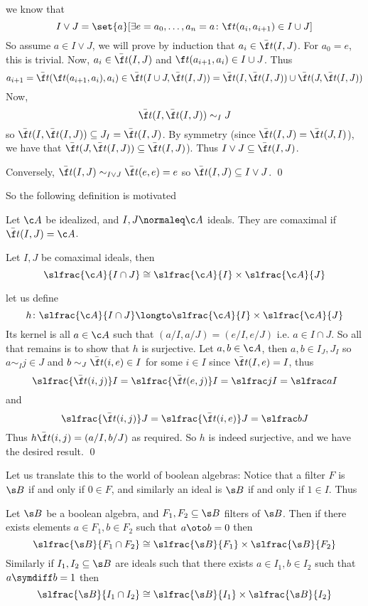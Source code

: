 \Proof we know that
$$ I\vee J = \set{a}[\exists e=a_0,\dots,a_n=a\colon\f t(a_i,a_{i+1})\in I\cup J] $$
So assume $a\in I\vee J$, we will prove by induction that $a_i\in\bar{\f t}(I,J)$.
For $a_0=e$, this is trivial.
Now, $a_i\in\bar{\f t}(I,J)$ and $\f t(a_{i+1},a_i)\in I\cup J$.
Thus
$$ a_{i+1} = \bar{\f t}(\f t(a_{i+1},a_i),a_i) \in \bar{\f t}(I\cup J,\bar{\f t}(I,J)) = \bar{\f t}(I,\bar{\f t}(I,J)) \cup \bar{\f t}(J,\bar{\f t}(I,J)) $$
Now,
$$ \bar{\f t}(I,\bar{\f t}(I,J)) \sim_I J $$
so $\bar{\f t}(I,\bar{\f t}(I,J))\subseteq J_I=\bar{\f t}(I,J)$.
By symmetry (since $\bar{\f t}(I,J)=\bar{\f t}(J,I)$), we have that $\bar{\f t}(J,\bar{\f t}(I,J))\subseteq\bar{\f t}(I,J)$).
Thus $I\vee J\subseteq\bar{\f t}(I,J)$.

Conversely, $\bar{\f t}(I,J)\sim_{I\vee J}\bar{\f t}(e,e)=e$ so $\bar{\f t}(I,J)\subseteq I\vee J$.
\qed

So the following definition is motivated

\bdefn

    Let $\c A$ be idealized, and $I,J\normaleq\c A$ ideals.
    They are {\emphcolor comaximal} if $\bar{\f t}(I,J)=\c A$.

\edefn

\bthrm[title=The Idealized Chinese Remainder Theorem]

    Let $I,J$ be comaximal ideals, then
    $$ \slfrac{\c A}{I\cap J} \cong \slfrac{\c A}{I}\times\slfrac{\c A}{J} $$

\ethrm

\Proof let us define
$$ h\colon\slfrac{\c A}{I\cap J} \longto \slfrac{\c A}{I}\times\slfrac{\c A}{J} $$
Its kernel is all $a\in\c A$ such that $(a/I,a/J)=(e/I,e/J)$ i.e. $a\in I\cap J$.
So all that remains is to show that $h$ is surjective.
Let $a,b\in\c A$, then $a,b\in I_J,J_I$ so $a\sim_Ij\in J$ and $b\sim_J\bar{\f t}(i,e)\in I$ for some $i\in I$ since $\bar{\f t}(I,e)=I$, thus
$$ \slfrac{\bar{\f t}(i,j)}I = \slfrac{\bar{\f t}(e,j)}I = \slfrac jI = \slfrac aI $$
and
$$ \slfrac{\bar{\f t}(i,j)}J = \slfrac{\bar{\f t}(i,e)}J = \slfrac bJ $$
Thus $h\bar{\f t}(i,j)=(a/I,b/J)$ as required.
So $h$ is indeed surjective, and we have the desired result.
\qed

Let us translate this to the world of boolean algebras:
Notice that a filter $F$ is $\s B$ if and only if $0\in F$, and similarly an ideal is $\s B$ if and only if $1\in I$.
Thus

\bthrm

    Let $\s B$ be a boolean algebra, and $F_1,F_2\subseteq\s B$ filters of $\s B$.
    Then if there exists elements $a\in F_1,b\in F_2$ such that $a\oto b=0$ then
    $$ \slfrac{\s B}{F_1\cap F_2} \cong \slfrac{\s B}{F_1}\times\slfrac{\s B}{F_2} $$
    Similarly if $I_1,I_2\subseteq\s B$ are ideals such that there exists $a\in I_1,b\in I_2$ such that $a\symdiff b=1$ then
    $$ \slfrac{\s B}{I_1\cap I_2} \cong \slfrac{\s B}{I_1}\times\slfrac{\s B}{I_2} $$

\ethrm

\bye

